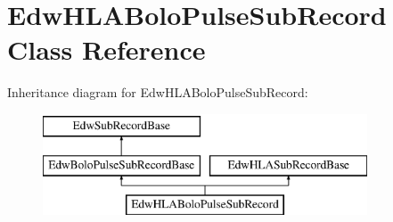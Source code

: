 \hypertarget{class_edw_h_l_a_bolo_pulse_sub_record}{
\section{EdwHLABoloPulseSubRecord Class Reference}
\label{class_edw_h_l_a_bolo_pulse_sub_record}
}
Inheritance diagram for EdwHLABoloPulseSubRecord:\begin{figure}[H]
\begin{center}
\leavevmode
\includegraphics[height=3cm]{class_edw_h_l_a_bolo_pulse_sub_record}
\end{center}
\end{figure}
